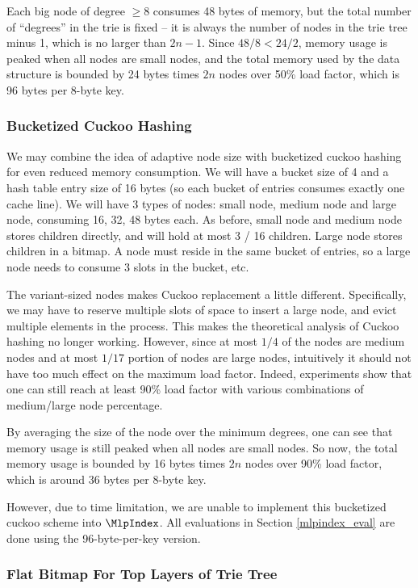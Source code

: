 \documentclass[11pt, usletter]{article}
\begin{document}
Each big node of degree $\geq 8$ consumes 48 bytes of memory, but the total number of ``degrees'' in the trie is fixed 
-- it is always the number of nodes in the trie tree minus 1, which is no larger than $2n-1$. 
Since $48/8<24/2$, memory usage is peaked when all nodes are small nodes, 
and the total memory used by the data structure is bounded by 24 bytes times $2n$ nodes over 50\% load factor, 
which is 96 bytes per 8-byte key.

\subsubsection*{Bucketized Cuckoo Hashing}  \label{variantsizehash}

We may combine the idea of adaptive node size with bucketized cuckoo hashing for even reduced memory consumption. 
We will have a bucket size of 4 and a hash table entry size of 16 bytes (so each bucket of entries consumes exactly one cache line).
We will have 3 types of nodes: small node, medium node and large node, consuming 16, 32, 48 bytes each. 
As before, small node and medium node stores children directly, and will hold at most 3 / 16 children. 
Large node stores children in a bitmap. A node must reside in the same bucket of entries, 
so a large node needs to consume 3 slots in the bucket, etc.

The variant-sized nodes makes Cuckoo replacement a little different. 
Specifically, we may have to reserve multiple slots of space to insert a large node, 
and evict multiple elements in the process. 
This makes the theoretical analysis of Cuckoo hashing no longer working. 
However, since at most $1/4$ of the nodes are medium nodes 
and at most $1/17$ portion of nodes are large nodes, 
intuitively it should not have too much effect on the maximum load factor. 
Indeed, experiments show that one can still reach at least 90\% load factor with various combinations 
of medium/large node percentage.

By averaging the size of the node over the minimum degrees, 
one can see that memory usage is still peaked when all nodes are small nodes.
So now, the total memory usage is bounded by 16 bytes times $2n$ nodes over 90\% load factor, 
which is around 36 bytes per 8-byte key.

However, due to time limitation, we are unable to implement this bucketized cuckoo scheme 
into $\MlpIndex$. All evaluations in Section \ref{mlpindex_eval} are done using the 96-byte-per-key version. 

\subsubsection*{Flat Bitmap For Top Layers of Trie Tree}
\end{document}
